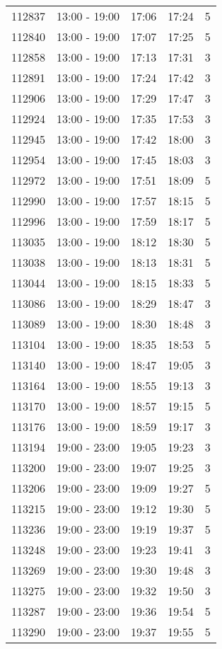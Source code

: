\documentclass{article}
\begin{document}
\begin{tabular}{llccc}
112837 & 13:00 - 19:00 & 17:06 & 17:24 & 5 \\
112840 & 13:00 - 19:00 & 17:07 & 17:25 & 5 \\
112858 & 13:00 - 19:00 & 17:13 & 17:31 & 3 \\
112891 & 13:00 - 19:00 & 17:24 & 17:42 & 3 \\
112906 & 13:00 - 19:00 & 17:29 & 17:47 & 3 \\
112924 & 13:00 - 19:00 & 17:35 & 17:53 & 3 \\
112945 & 13:00 - 19:00 & 17:42 & 18:00 & 3 \\
112954 & 13:00 - 19:00 & 17:45 & 18:03 & 3 \\
112972 & 13:00 - 19:00 & 17:51 & 18:09 & 5 \\
112990 & 13:00 - 19:00 & 17:57 & 18:15 & 5 \\
112996 & 13:00 - 19:00 & 17:59 & 18:17 & 5 \\
113035 & 13:00 - 19:00 & 18:12 & 18:30 & 5 \\
113038 & 13:00 - 19:00 & 18:13 & 18:31 & 5 \\
113044 & 13:00 - 19:00 & 18:15 & 18:33 & 5 \\
113086 & 13:00 - 19:00 & 18:29 & 18:47 & 3 \\
113089 & 13:00 - 19:00 & 18:30 & 18:48 & 3 \\
113104 & 13:00 - 19:00 & 18:35 & 18:53 & 5 \\
113140 & 13:00 - 19:00 & 18:47 & 19:05 & 3 \\
113164 & 13:00 - 19:00 & 18:55 & 19:13 & 3 \\
113170 & 13:00 - 19:00 & 18:57 & 19:15 & 5 \\
113176 & 13:00 - 19:00 & 18:59 & 19:17 & 3 \\
113194 & 19:00 - 23:00 & 19:05 & 19:23 & 3 \\
113200 & 19:00 - 23:00 & 19:07 & 19:25 & 3 \\
113206 & 19:00 - 23:00 & 19:09 & 19:27 & 5 \\
113215 & 19:00 - 23:00 & 19:12 & 19:30 & 5 \\
113236 & 19:00 - 23:00 & 19:19 & 19:37 & 5 \\
113248 & 19:00 - 23:00 & 19:23 & 19:41 & 3 \\
113269 & 19:00 - 23:00 & 19:30 & 19:48 & 3 \\
113275 & 19:00 - 23:00 & 19:32 & 19:50 & 3 \\
113287 & 19:00 - 23:00 & 19:36 & 19:54 & 5 \\
113290 & 19:00 - 23:00 & 19:37 & 19:55 & 5 \\

\end{tabular}
\end{document}
